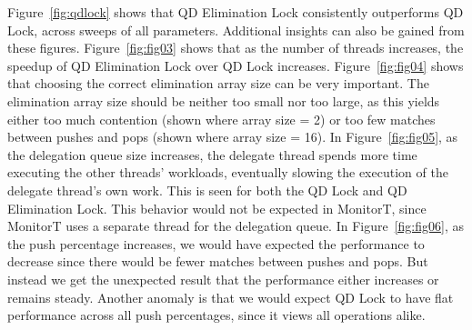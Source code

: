 Figure~\ref{fig:qdlock} shows that QD Elimination Lock consistently outperforms QD Lock, across sweeps of all parameters. Additional insights can also be gained from these figures. Figure~\ref{fig:fig03} shows that as the number of threads increases, the speedup of QD Elimination Lock over QD Lock increases. Figure~\ref{fig:fig04} shows that choosing the correct elimination array size can be very important. The elimination array size should be neither too small nor too large, as this yields either too much contention (shown where array size = 2) or too few matches between pushes and pops (shown where array size = 16). In Figure~\ref{fig:fig05}, as the delegation queue size increases, the delegate thread spends more time executing the other threads' workloads, eventually slowing the execution of the delegate thread's own work. This is seen for both the QD Lock and QD Elimination Lock. This behavior would not be expected in MonitorT, since MonitorT uses a separate thread for the delegation queue. In Figure~\ref{fig:fig06}, as the push percentage increases, we would have expected the performance to decrease since there would be fewer matches between pushes and pops. But instead we get the unexpected result that the performance either increases or remains steady. Another anomaly is that we would expect QD Lock to have flat performance across all push percentages, since it views all operations alike.

